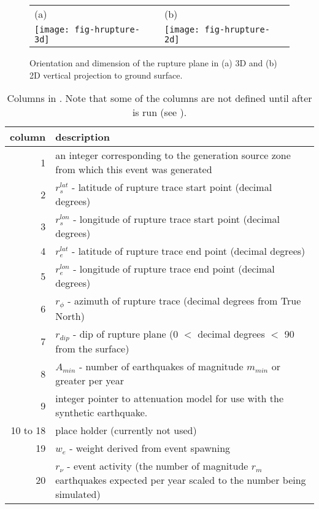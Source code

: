 \begin{figure}[htp]
\begin{center}
\begin{tabular}{ll}
(a) & (b) \\
\texttt{[image: fig-hrupture-3d]} &
\texttt{[image: fig-hrupture-2d]}
\end{tabular}
\end{center}
\caption{Orientation and dimension of the rupture plane in (a) 3D
and (b) 2D vertical projection to ground surface.}
\label{fig:hrupture-3d}
\end{figure}




\begin{table}
\centering \caption{Columns in . Note
that some of the columns are not defined until after
 is run (see
).}
 \label{tab:evntdb-columns}
\vspace{0.8em}
\begin{tabular}{r|p{}}
\hline
column & description \\
\hline
1 & an integer corresponding to the generation source zone from which this event was generated \\
2 & $r_s^{lat}$ - latitude of rupture trace start point (decimal degrees)\\
3 & $r_s^{lon}$ - longitude of rupture trace start point (decimal degrees)\\
4 & $r_e^{lat}$ - latitude of rupture trace end point (decimal degrees)\\
5 & $r_e^{lon}$ - longitude of rupture trace end point (decimal degrees)\\
6 & $r_\phi$ - azimuth of rupture trace (decimal degrees from True North)\\
7 & $r_{dip}$ - dip of rupture plane (0 $<$ decimal degrees $<$ 90 from the surface) \\
8 & $A_{min}$ - number of earthquakes of magnitude $m_{min}$ or greater per year\\
9 & integer pointer to attenuation model for use with the synthetic earthquake.\\
10 to 18 & place holder (currently not used) \\
19 & $w_e$ - weight derived from event spawning  \\
20 & $r_\nu$ - event activity (the number of magnitude $r_m$ earthquakes expected per year scaled to the number being simulated) \\

\end{tabular}
\end{table}
